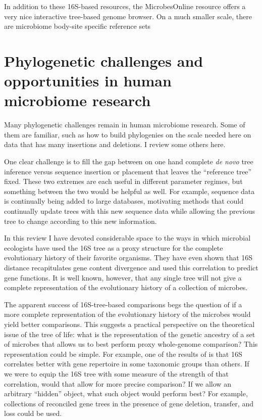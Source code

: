 \documentclass{amsart}
\begin{document}
In addition to these 16S-based resources, the MicrobesOnline resource \citep{dehal2010microbesonline} offers a very nice interactive tree-based genome browser.
On a much smaller scale, there are microbiome body-site specific reference sets \citep{chen2010human,griffen2011core,srinivasan2012bacterial}



\section{Phylogenetic challenges and opportunities in human microbiome research}

Many phylogenetic challenges remain in human microbiome research.
Some of them are familiar, such as how to build phylogenies on the scale needed here on data that has many insertions and deletions.
I review some others here.

One clear challenge is to fill the gap between on one hand complete \emph{de novo} tree inference versus sequence insertion or placement that leaves the ``reference tree'' fixed.
These two extremes are each useful in different parameter regimes, but something between the two would be helpful as well.
For example, sequence data is continually being added to large databases, motivating methods that could continually update trees with this new sequence data while allowing the previous tree to change according to this new information.

In this review I have devoted considerable space to the ways in which microbial ecologists have used the 16S tree as a proxy structure for the complete evolutionary history of their favorite organisms.
They have even shown that 16S distance recapitulates gene content divergence and used this correlation to predict gene functions.
It is well known, however, that any single tree will not give a complete representation of the evolutionary history of a collection of microbes.

The apparent success of 16S-tree-based comparisons begs the question of if a more complete representation of the evolutionary history of the microbes would yield better comparisons.
This suggests a practical perspective on the theoretical issue of the tree of life: what is the representation of the genetic ancestry of a set of microbes that allows us to best perform proxy whole-genome comparison?
This representation could be simple.
For example, one of the results of \citet{zaneveld2010ribosomal} is that 16S correlates better with gene repertoire in some taxonomic groups than others.
If we were to equip the 16S tree with some measure of the strength of that correlation, would that allow for more precise comparison?
If we allow an arbitrary ``hidden'' object, what such object would perform best?
For example, collections of reconciled gene trees in the presence of gene deletion, transfer, and loss \citep[see][for interesting recent results]{szollHosi2013efficient,szollHosi2013lateral} could be used.
\end{document}
